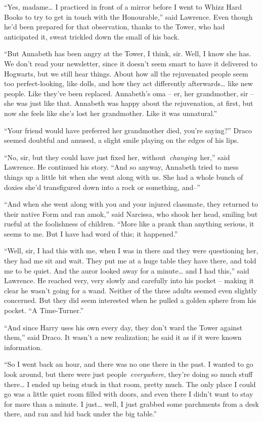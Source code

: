 ``Yes, madame\ldots{} I practiced in front of a mirror before I went to
Whizz Hard Books to try to get in touch with the Honourable,'' said
Lawrence. Even though he'd been prepared for that observation, thanks to
the Tower, who had anticipated it, sweat trickled down the small of his
back.

``But Annabeth has been angry at the Tower, I think, sir. Well, I know
she has. We don't read your newsletter, since it doesn't seem smart to
have it delivered to Hogwarts, but we still hear things. About how all
the rejuvenated people seem too perfect-looking, like dolls, and how
they act differently afterwards\ldots{} like new people. Like they've
been replaced. Annabeth's oma -- er, her grandmother, sir -- she was
just like that. Annabeth was happy about the rejuvenation, at first, but
now she feels like she's lost her grandmother. Like it was unnatural.''

``Your friend would have preferred her grandmother died, you're
saying?'' Draco seemed doubtful and amused, a slight smile playing on
the edges of his lips.

``No, sir, but they could have just fixed her,
without~\emph{changing}~her,'' said Lawrence. He continued his story.
``And so anyway, Annabeth tried to mess things up a little bit when she
went along with us. She had a whole bunch of doxies she'd transfigured
down into a rock or something, and--''

``And when she went along with you and your injured classmate, they
returned to their native Form and ran amok,'' said Narcissa, who shook
her head, smiling but rueful at the foolishness of children. ``More like
a prank than anything serious, it seems to me. But I have had word of
this; it happened.''

``Well, sir, I had this with me, when I was in there and they were
questioning her, they had me sit and wait. They put me at a huge table
they have there, and told me to be quiet. And the auror looked away for
a minute\ldots{} and I had this,'' said Lawrence. He reached very, very
slowly and carefully into his pocket -- making it clear he wasn't going
for a wand. Neither of the three adults seemed even slightly concerned.
But they did seem interested when he pulled a golden sphere from his
pocket. ``A Time-Turner.''

``And since Harry uses his own every day, they don't ward the Tower
against them,'' said Draco. It wasn't a new realization; he said it as
if it were known information.

``So I went back an hour, and there was no one there in the past. I
wanted to go look around, but there were just people~\emph{everywhere},
they're doing so much stuff there\ldots{} I ended up being stuck in that
room, pretty much. The only place I could go was a little quiet room
filled with doors, and even there I didn't want to stay for more than a
minute. I just\ldots{} well, I just grabbed some parchments from a desk
there, and ran and hid back under the big table.''

